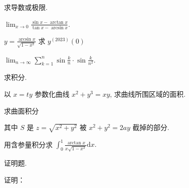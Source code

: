 \par{}
求导数或极限.\par
$\lim_{x\to 0}\frac{\sin x - \arctan x}{\tan x - \arcsin x}.$\par
$y = \frac{\arcsin x}{\sqrt{1 - x^2}}$ 求 $y^{(2023)}(0)$\par
$\lim_{n\to \infty}\sum_{k = 1}^{n}\sin \frac{k}{n}\cdot \sin \frac{k}{n^2}.$\par
\par{}
求积分.\par
以 $x = ty$ 参数化曲线 $x^{2} + y^{3} = xy$, 求曲线所围区域的面积.\par
\par{}
求曲面积分\par
\nopagebreak[4]
其中 $S$ 是 $z = \sqrt{x^2 + y^2}$ 被 $x^{2} + y^{2} = 2ay$ 截掉的部分.\par
用含参量积分求 $\int_0^1\frac{\arctan x}{x\sqrt{1 - x^2}}\mathrm{d}x.$\par
\par{}
证明题.\par
\par{}
证明：\par
\nopagebreak[4]
\par{}
